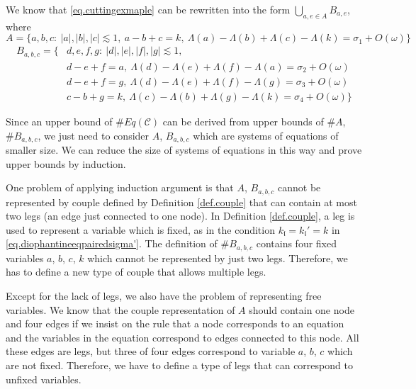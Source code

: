 We know that \eqref{eq.cuttingexmaple} can be rewritten into the form $\bigcup_{a,e\in A} B_{a,e}$, where
\begin{equation}\label{eq.couplequationA}
    A=\{a, b, c:\ |a|,|b|,|c|\lesssim 1,\ a - b + c = k,\ \Lambda(a) - \Lambda(b) + \Lambda(c) - \Lambda(k) =\sigma_{1} + O(\omega)\}
\end{equation}
\begin{equation}\label{eq.couplequationB}
    \begin{split}
        B_{a,b,c}=\{&d, e, f, g:\ |d|,|e|,|f|,|g|\lesssim 1,
        \\
        &d - e + f = a,\ \Lambda(d) - \Lambda(e) + \Lambda(f) - \Lambda(a) =\sigma_{2} + O(\omega)
        \\
        &d - e + f = g,\ \Lambda(d) - \Lambda(e) + \Lambda(f) - \Lambda(g) =\sigma_{3} + O(\omega)
        \\
        &c - b + g = k,\ \Lambda(c) - \Lambda(b) + \Lambda(g) - \Lambda(k)  =\sigma_{4} + O(\omega)\}
    \end{split}    
\end{equation}

Since an upper bound of $\# Eq(\mathcal{C})$ can be derived from upper bounds of $\# A$, $\# B_{a,b,c}$, we just need to consider $A$, $B_{a,b,c}$ which are systems of equations of smaller size. We can reduce the size of systems of equations in this way and prove upper bounds by induction.

One problem of applying induction argument is that $A$, $B_{a,b,c}$ cannot be represented by couple defined by Definition \ref{def.couple} that can contain at most two legs (an edge just connected to one node). In Definition \ref{def.couple}, a leg is used to represent a variable which is fixed, as in the condition $k_{\mathfrak{l}} = k_{\mathfrak{l}}'= k$ in \eqref{eq.diophantineeqpairedsigma'}. The definition of $\# B_{a,b,c}$ contains four fixed variables $a$, $b$, $c$, $k$ which cannot be represented by just two legs. Therefore, we has to define a new type of couple that allows multiple legs.

Except for the lack of legs, we also have the problem of representing free variables. We know that the couple representation of $A$ should contain one node and four edges if we insist on the rule that a node corresponds to an equation and the variables in the equation correspond to edges connected to this node. All these edges are legs, but three of four edges correspond to variable $a$, $b$, $c$ which are not fixed. Therefore, we have to define a type of legs that can correspond to unfixed variables.

